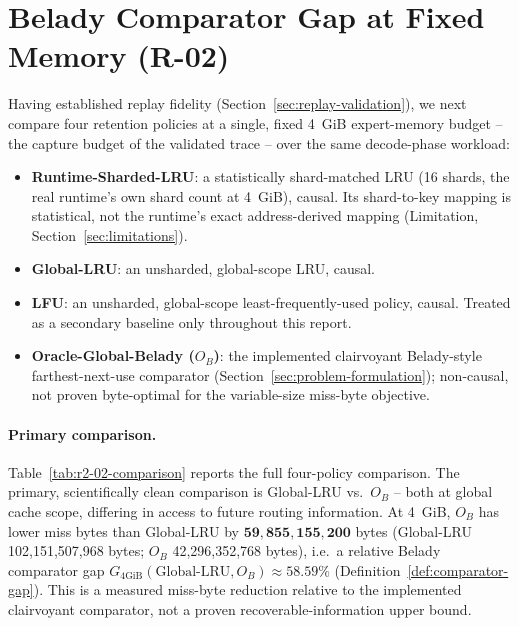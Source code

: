 \section{Belady Comparator Gap at Fixed Memory (R-02)}
\label{sec:oracle-headroom}

Having established replay fidelity (Section~\ref{sec:replay-validation}),
we next compare four retention policies at a single, fixed 4~GiB
expert-memory budget -- the capture budget of the validated trace -- over
the same decode-phase workload:
\begin{itemize}
 \item \textbf{Runtime-Sharded-LRU}: a statistically shard-matched LRU
   (16 shards, the real runtime's own shard count at 4~GiB), causal.
   Its shard-to-key mapping is statistical, not the runtime's exact
   address-derived mapping (Limitation, Section~\ref{sec:limitations}).
 \item \textbf{Global-LRU}: an unsharded, global-scope LRU, causal.
 \item \textbf{LFU}: an unsharded, global-scope least-frequently-used
   policy, causal. Treated as a secondary baseline only throughout this
   report.
 \item \textbf{Oracle-Global-Belady ($O_B$)}: the implemented clairvoyant
   Belady-style farthest-next-use comparator
   (Section~\ref{sec:problem-formulation}); non-causal, not proven
   byte-optimal for the variable-size miss-byte objective.
\end{itemize}

\newcommand{\fixthis}{}


\paragraph{Primary comparison.} Table~\ref{tab:r2-02-comparison}
reports the full four-policy comparison. The primary, scientifically
clean comparison is Global-LRU vs.\ $O_B$ -- both at global cache scope,
differing in access to future routing information. At 4~GiB, $O_B$ has
lower miss bytes than Global-LRU by
$\mathbf{59{,}855{,}155{,}200}$ bytes (Global-LRU 102,151,507,968 bytes;
$O_B$ 42,296,352,768 bytes), i.e.\ a relative Belady comparator gap
$G_{4\text{GiB}}(\text{Global-LRU},O_B) \approx 58.59\%$
(Definition~\ref{def:comparator-gap}). This is a measured miss-byte
reduction relative to the implemented clairvoyant comparator, not a proven
recoverable-information upper bound.

